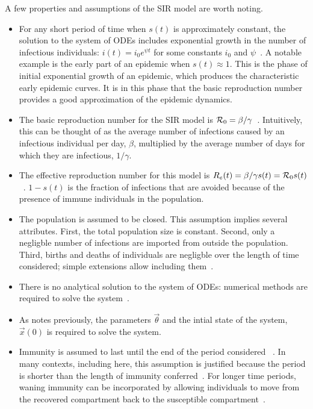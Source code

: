 \documentclass[thesis.tex]{subfiles}
\begin{document}
A few properties and assumptions of the SIR model are worth noting.
\begin{itemize}
    \item For any short period of time when $s(t)$ is approximately constant, the solution to the system of ODEs includes exponential growth in the number of infectious individuals: $i(t) = i_0 e^{\psi t}$ for some constants $i_0$ and $\psi$~\autocite[section 1.2]{diekmannMathematical}.
    A notable example is the early part of an epidemic when $s(t) \approx 1$.
    This is the phase of initial exponential growth of an epidemic, which produces the characteristic early epidemic curves.
    It is in this phase that the basic reproduction number provides a good approximation of the epidemic dynamics.
    \item The basic reproduction number for the SIR model is $\mathcal{R}_{0} = \beta / \gamma$~\autocite[20]{keelingModeling}.
    Intuitively, this can be thought of as the average number of infections caused by an infectious individual per day, $\beta$, multiplied by the average number of days for which they are infectious, $1/\gamma$.
    \item The effective reproduction number for this model is $R_e(t) = \beta / \gamma s(t) = \mathcal{R}_{0} s(t)$~\autocite{pellisEstimation}.
    $1-s(t)$ is the fraction of infections that are avoided because of the presence of immune individuals in the population.
    \item The population is assumed to be closed.
    This assumption implies several attributes.
    First, the total population size is constant.
    Second, only a negligble number of infections are imported from outside the population.
    Third, births and deaths of individuals are negligble over the length of time considered; simple extensions allow including them~\autocites[26]{keelingModeling}[214]{kretzschmarMathematical}.
    \item There is no analytical solution to the system of ODEs: numerical methods are required to solve the system~\autocite[25]{keelingModeling}.
    \item As notes previously, the parameters $\vec{\theta}$ and the intial state of the system, $\vec{x}(0)$ is required to solve the system.
    \item Immunity is assumed to last until the end of the  period considered ~\autocite[61]{andersonInfectious}.
    In many contexts, including here, this assumption is justified because the period is shorter than the length of immunity conferred~\autocite{milneImmunity}.
    For longer time periods, waning immunity can be incorporated by allowing individuals to move from the recovered compartment back to the susceptible compartment~\autocite[40]{keelingModeling}.
\end{itemize}
\end{document}
